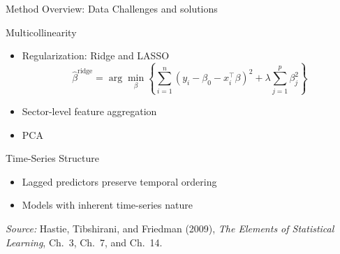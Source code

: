 \documentclass[aspectratio=169,t]{beamer} %
\begin{document}
\begin{frame}[t,shrink=8]{Method Overview: Data Challenges and solutions}
\begin{block}{Multicollinearity}
\begin{itemize}
    \item  Regularization: Ridge and LASSO %
    \[
    \hat{\beta}^{\mathrm{ridge}}
    = \arg\min_{\beta}\left\{
    \sum_{i=1}^n (y_i-\beta_0-x_i^\top \beta)^2
    + \lambda \sum_{j=1}^p \beta_j^2
    \right\}
    \]
    \item Sector-level feature aggregation
    \item PCA 
\end{itemize}
\end{block}

\begin{alertblock}{Time-Series Structure}
\begin{itemize}
    \item Lagged predictors preserve temporal ordering
    \item Models with inherent time-series nature
\end{itemize}
\end{alertblock}

\vfill
{\tiny \textit{Source:} Hastie, Tibshirani, and Friedman (2009), \textit{The Elements of Statistical Learning}, Ch.~3, Ch.~7, and Ch.~14.}

\end{frame}
\end{document}

